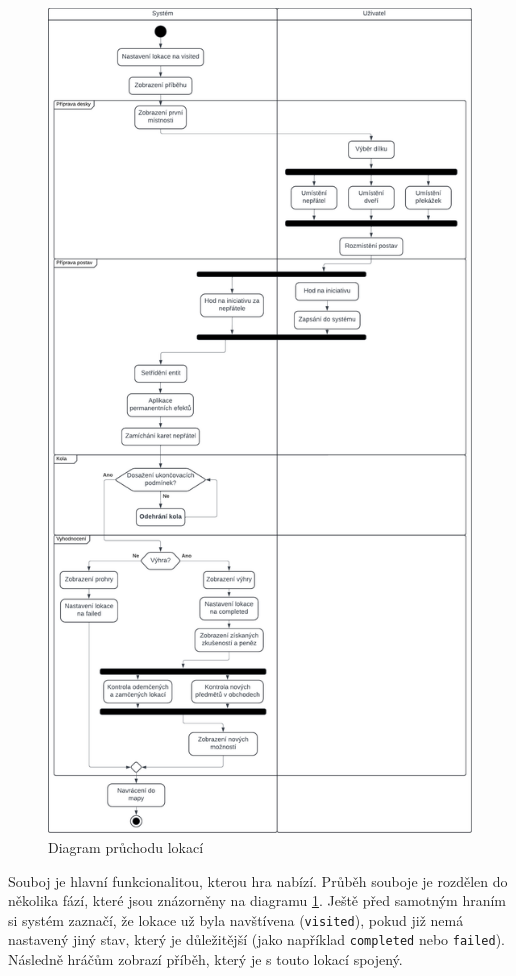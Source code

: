 \begin{figure}[H]
    \centering
    \includegraphics[height=0.9\textheight]{figures/diagrams/encounter.pdf}
    \caption{Diagram průchodu lokací}
    \label{diag:encounter}
\end{figure}

Souboj je hlavní funkcionalitou, kterou hra nabízí. Průběh souboje je rozdělen do několika fází, které jsou znázorněny na diagramu \ref{diag:encounter}. Ještě před samotným hraním si systém zaznačí, že lokace už byla navštívena (\texttt{visited}), pokud již nemá nastavený jiný stav, který je důležitější (jako například \texttt{completed} nebo \texttt{failed}). Následně hráčům zobrazí příběh, který je s touto lokací spojený.

